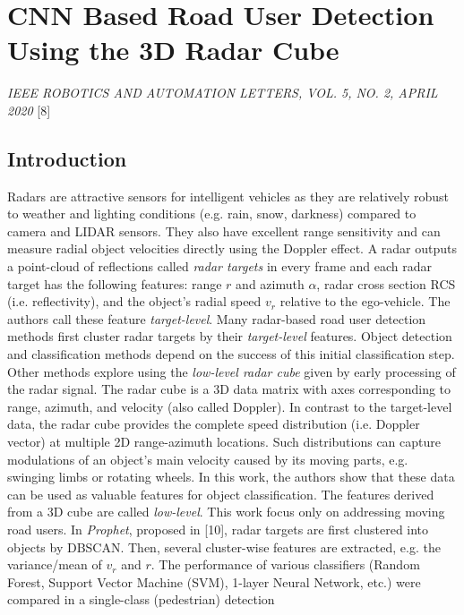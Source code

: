\section{CNN Based Road User Detection Using the 3D Radar
Cube}\label{header-n359}

\emph{IEEE ROBOTICS AND AUTOMATION LETTERS, VOL. 5, NO. 2, APRIL 2020}
{[}8{]}

\subsection{Introduction}\label{header-n361}

Radars are attractive sensors for intelligent vehicles as they are
relatively robust to weather and lighting conditions (e.g. rain, snow,
darkness) compared to camera and LIDAR sensors. They also have excellent
range sensitivity and can measure radial object velocities directly
using the Doppler effect. A radar outputs a point-cloud of reflections
called \emph{radar targets} in every frame and each radar target has the
following features: range $r$ and azimuth $\alpha$, radar cross
section RCS (i.e. reflectivity), and the object's radial speed $v_r$
relative to the ego-vehicle. The authors call these feature
\emph{target-level}. Many radar-based road user detection methods first
cluster radar targets by their \emph{target-level} features. Object
detection and classification methods depend on the success of this
initial classification step. Other methods explore using the
\emph{low-level radar cube} given by early processing of the radar
signal. The radar cube is a 3D data matrix with axes corresponding to
range, azimuth, and velocity (also called Doppler). In contrast to the
target-level data, the radar cube provides the complete speed
distribution (i.e. Doppler vector) at multiple 2D range-azimuth
locations. Such distributions can capture modulations of an object's
main velocity caused by its moving parts, e.g. swinging limbs or
rotating wheels. In this work, the authors show that these data can be
used as valuable features for object classification. The features
derived from a 3D cube are called \emph{low-level}. This work focus only
on addressing moving road users. In \emph{Prophet}, proposed in
{[}10{]}, radar targets are first clustered into objects by DBSCAN.
Then, several cluster-wise features are extracted, e.g. the
variance/mean of $v_r$ and $r$. The performance of various
classifiers (Random Forest, Support Vector Machine (SVM), 1-layer Neural
Network, etc.) were compared in a single-class (pedestrian) detection
